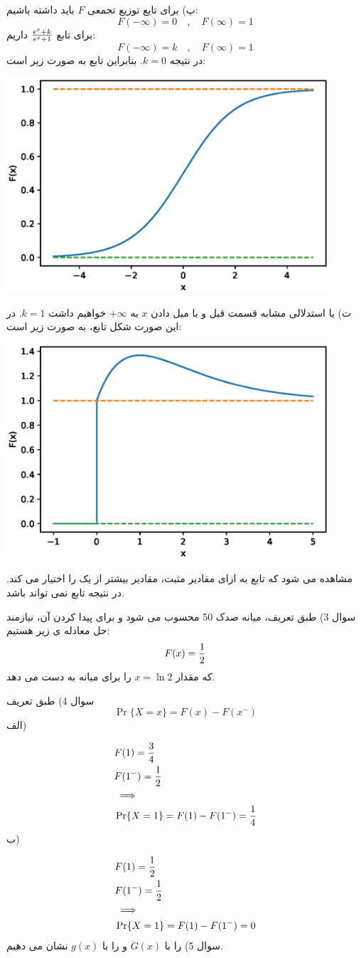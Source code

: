 \documentclass[10pt,letterpaper]{report}
\newcommand{\eqn}[1]{
\[\begin{split}
#1
\end{split}\]
}
\begin{document}
پ) برای تایع توزیع تجمعی $F$ باید داشته باشیم:
$$
F(-\infty)=0\quad,\quad F(\infty)=1
$$
برای تابع 
$
{e^x+k\over e^x+1}
$
داریم:
$$
F(-\infty)=k\quad,\quad F(\infty)=1
$$
در نتیجه $k=0$. بنابراین تابع  به صورت زیر است:
\begin{center}
\includegraphics[width=120mm]{Q2B.eps}
\end{center}
ت) یا استدلالی مشابه قسمت قبل و با میل دادن $x$ به $+\infty$ خواهیم داشت $k=1$. در این صورت شکل تابع، به صورت زیر است:
\begin{center}
\includegraphics[width=120mm]{Q2C.eps}
\end{center}
مشاهده می شود که تابع به ازای مقادیر مثبت، مقادیر بیشتر از یک را اختیار می کند. در نتیجه تابع نمی تواند  باشد.

سوال 3) طبق تعریف، میانه صدک 50 محسوب می شود و برای پیدا کردن آن، نیازمند حل معادله ی زیر هستیم:
$$
F(x)={1\over 2}
$$
 که مقدار $x=\ln2$ را برای میانه به دست می دهد.

سوال 4) طبق تعریف
$$
\Pr\{X=x\}=F(x)-F(x^-)
$$
الف)
\eqn{
&F(1)={3\over 4}
\\&F(1^-)={1\over 2}
\\&\implies
\\&\Pr\{X=1\}=F(1)-F(1^-)={1\over 4}
}{}
ب)
\eqn{
&F(1)={1\over 2}
\\&F(1^-)={1\over 2}
\\&\implies
\\&\Pr\{X=1\}=F(1)-F(1^-)=0
}{}
سوال 5)  را با $G(x)$ و  را با $g(x)$ نشان می دهیم.
\end{document}
